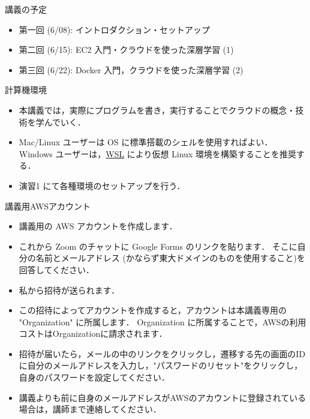 \documentclass[unicode,11pt]{beamer}
\begin{document}
\begin{frame}{講義の予定}
    \begin{itemize}
        \item 第一回 (6/08): イントロダクション・セットアップ
        \item 第二回 (6/15): EC2 入門・クラウドを使った深層学習 (1)
        \item 第三回 (6/22): Docker 入門，クラウドを使った深層学習 (2)
    \end{itemize}
\end{frame}

\begin{frame}{計算機環境}

\begin{itemize}
    \item 本講義では，実際にプログラムを書き，実行することでクラウドの概念・技術を学んでいく．
    \item Mac/Linux ユーザーは OS に標準搭載のシェルを使用すればよい．
Windows ユーザーは，\href{https://docs.microsoft.com/en-us/windows/wsl/install}{WSL} により仮想 Linux 環境を構築することを推奨する．
    \item 演習1 にて各種環境のセットアップを行う．
\end{itemize}

\end{frame}

\begin{frame}{講義用AWSアカウント}

\begin{itemize}
    \item 講義用の AWS アカウントを作成します．
    \item これから Zoom のチャットに Google Forms のリンクを貼ります．
    そこに自分の名前とメールアドレス (かならず東大ドメインのものを使用すること)を回答してください．
    \item 私から招待が送られます．
    \item この招待によってアカウントを作成すると，アカウントは本講義専用の "Organization" に所属します．
    \teim Organization に所属することで，AWSの利用コストはOrganizationに請求されます．
    \item 招待が届いたら，メールの中のリンクをクリックし，遷移する先の画面のIDに自分のメールアドレスを入力し，"パスワードのリセット"をクリックし，自身のパスワードを設定してください．
    \item 講義よりも前に自身のメールアドレスがAWSのアカウントに登録されている場合は，講師まで連絡してください．
\end{itemize}

\end{frame}
\end{document}

